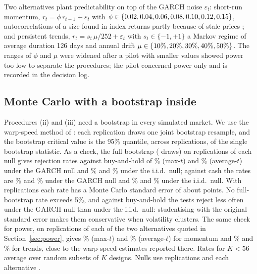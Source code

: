 \documentclass[pdflatex,sn-basic]{sn-jnl}
\theoremstyle{thmstyleone}
\theoremstyle{thmstylethree}
\begin{document}
Two alternatives plant predictability on top of the GARCH noise $\varepsilon_t$: short-run momentum,
$r_t=\phi\, r_{t-1}+\varepsilon_t$ with $\phi\in\{0.02, 0.04, 0.06, 0.08, 0.10, 0.12, 0.15\}$, autocorrelations of a size found in
index returns partly because of stale prices \citep{lo1990nonsync}; and persistent trends,
$r_t=s_t\,\mu/252+\varepsilon_t$ with $s_t\in\{-1,+1\}$ a Markov regime of average duration 126 days
\citep{hamilton1989} and annual drift $\mu\in\{10\%, 20\%, 30\%, 40\%, 50\%\}$. The ranges of $\phi$ and $\mu$ were
widened after a pilot with smaller values showed power too low to separate the procedures; the pilot
concerned power only and is recorded in the decision log.

\subsection{Monte Carlo with a bootstrap inside}\label{sec:warp}

Procedures (ii) and (iii) need a bootstrap in every simulated market. We use the warp-speed method of
\citet{giacomini2013}: each replication draws one joint bootstrap resample, and the bootstrap critical
value is the 95\% quantile, across replications, of the single bootstrap statistic. As a check, the full
bootstrap (\NumFullbootB{} draws) on \NumFullbootReps{} replications of each null gives rejection rates
against buy-and-hold of \NumFullbootMax\% (max-$t$) and \NumFullbootAvg\% (average-$t$) under the GARCH
null and \NumFullbootMaxIid\% and \NumFullbootAvgIid\% under the i.i.d.\ null; against cash the rates
are \NumFullbootMaxCash\% and \NumFullbootAvgCash\% under the GARCH null and \NumFullbootMaxCashIid\%
and \NumFullbootAvgCashIid\% under the i.i.d.\ null. With \NumFullbootReps{} replications each rate has a
Monte Carlo standard error of about \NumFullbootSE{} points. No full-bootstrap rate exceeds 5\%, and
against buy-and-hold the tests reject less often under the GARCH null than under the i.i.d.\ null:
studentising with the original standard error makes them conservative when volatility clusters. The same
check for power, on \NumFullbootPowerReps{} replications of each of the two alternatives quoted in
Section~\ref{sec:power}, gives \NumFullbootPowerMax\% (max-$t$) and \NumFullbootPowerAvg\% (average-$t$)
for momentum and \NumFullbootPowerMaxMu\% and \NumFullbootPowerAvgMu\% for trends, close to the
warp-speed estimates reported there. Rates for $K<56$ average over \NumSubsets{} random subsets of $K$
designs. Nulls use \NumNullReps{} replications and each alternative \NumAltReps.
\end{document}
